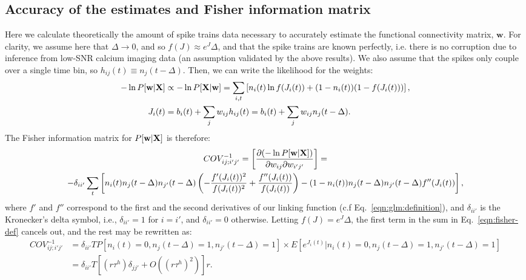 \documentclass[aoas,preprint]{imsart}
\newcommand{\w}{w}
\newcommand{\bw}{\mathbf{\w}}
\newcommand{\bX}{{\bf X}}
\begin{document}
\subsection{Accuracy of the estimates and Fisher information matrix} \label{sec:methods:accuracy_Fisher}

Here we calculate theoretically the amount of spike trains data necessary to accurately estimate the functional connectivity matrix, $\bw$. For clarity, we assume here that $\Delta \rightarrow 0$, and so $f(J)\approx e^J\Delta$, and that the spike trains are known perfectly, i.e. there is no corruption due to inference from low-SNR calcium imaging data (an assumption validated by the above results). We also assume that the spikes only couple over a single time bin, so $h_{ij}(t)\equiv n_j(t-\Delta)$. Then, we can write the likelihood for the weights:
\begin{align}\label{eqn:fisher-glm}
-\ln P[\bw | \bX] &\propto -\ln P[\bX | \bw] =
\sum\limits_{i,t} \left[ n_i(t) \ln f(J_i(t)) + (1-n_i(t)) (1-f(J_i(t))) \right], \\
J_i(t) &= b_i(t) + \sum\limits_j w_{ij} h_{ij}(t) = b_i(t) + \sum\limits_j w_{ij} n_j(t-\Delta) 
.
\end{align}
The Fisher information matrix for $P[\bw | \bX]$ is therefore:
\begin{multline}\label{eqn:fisher-def}
COV^{-1}_{ij;i'j'}=\left[\frac{\partial (-\ln P[\bw | \bX])}{\partial \w_{ij}\partial \w_{i'j'}}\right]
=\\-\delta_{ii'}\sum\limits_t\left[
n_i(t)n_{j}(t-\Delta)n_{j'}(t-\Delta)\left(-\frac{f'(J_i(t))^2}{f(J_i(t))^2} +
\frac{f''(J_i(t))}{f(J_i(t))}\right) -(1-n_i(t))n_{j}(t-\Delta)n_{j'}(t-\Delta)f''(J_i(t))\right],
\end{multline}
where $f'$ and $f''$ correspond to the first and the second derivatives of our linking function (c.f Eq.~\eqref{eqn:glm:definition}), and $\delta_{ii'}$ is the Kronecker's delta symbol, i.e., $\delta_{ii'}=1$ for $i=i'$, and $\delta_{ii'}=0$ otherwise.  Letting $f(J)=e^J\Delta$, the first term in the sum in Eq.~\eqref{eqn:fisher-def} cancels out, and the rest may be rewritten as:
\begin{align}\label{eqn:fisher}
COV^{-1}_{ij;i'j'}
&=\delta_{ii'} T P[n_i(t)=0, n_j(t-\Delta)=1, n_{j'}(t-\Delta)=1]%
\times E[e^{J_i(t)}|n_i(t)=0, n_j(t-\Delta)=1, n_{j'}(t-\Delta)=1] \nonumber \\
&= \delta_{ii'}T\left[(r \tau^h)\delta_{jj'}+O((r \tau^h)^2)\right]r.
\end{align}
\end{document}
